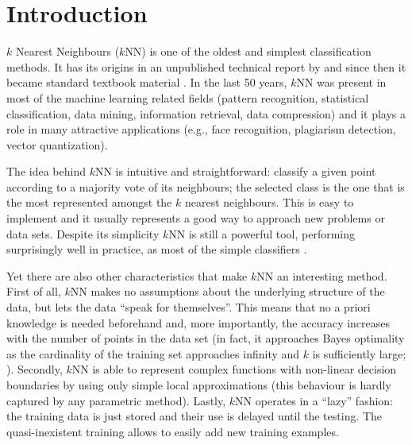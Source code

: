\chapter{Introduction}
\label{ch:introduction}

$k$ Nearest Neighbours ($k$NN) is one of the oldest and simplest classification methods. It has its origins in an unpublished technical report by \citet{fix1951} and since then it became standard textbook material \citep{russell1996,mitchell1997,bishop2006}. In the last 50 years, $k$NN was present in most of the machine learning related fields (pattern recognition, statistical classification, data mining, information retrieval, data compression) and it plays a role in many attractive applications (e.g., face recognition, plagiarism detection, vector quantization).

The idea behind $k$NN is intuitive and straightforward: classify a given point according to a majority vote of its neighbours; the selected class is the one that is the most represented amongst the $k$ nearest neighbours. This is easy to implement and it usually represents a good way to approach new problems or data sets. Despite its simplicity $k$NN is still a powerful tool, performing surprisingly well in practice, as most of the simple classifiers \citep{holte1993}.

Yet there are also other characteristics that make $k$NN an interesting method. First of all, $k$NN makes no assumptions about the underlying structure of the data, but lets the data ``speak for themselves''. This means that no a priori knowledge is needed beforehand and, more importantly, the accuracy increases with the number of points in the data set (in fact, it approaches Bayes optimality as the cardinality of the training set approaches infinity and $k$ is sufficiently large; \citealp{cover1967}). Secondly, $k$NN is able to represent complex functions with non-linear decision boundaries by using only simple local approximations (this behaviour is hardly captured by any parametric method). Lastly, $k$NN operates in a ``lazy'' fashion: the training data is just stored and their use is delayed until the testing. The quasi-inexistent training
 allows to easily add new training examples. 

